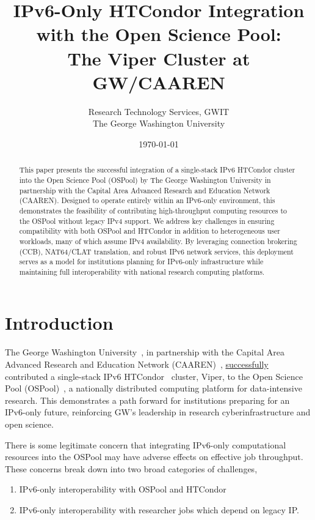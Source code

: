 \documentclass[11pt]{article}
\title{IPv6-Only HTCondor Integration with the Open Science Pool: \\
The Viper Cluster at GW/CAAREN}
\author{Research Technology Services, GWIT\\
The George Washington University}
\date{\today}
\begin{document}
\maketitle

\begin{abstract}
This paper presents the successful integration of a single-stack IPv6 HTCondor cluster into the Open Science Pool (OSPool) by The George Washington University in partnership with the Capital Area Advanced Research and Education Network (CAAREN). 
Designed to operate entirely within an IPv6-only environment, this demonstrates the feasibility of contributing 
high-throughput computing resources to the OSPool without legacy IPv4 support. We address key challenges in ensuring compatibility
with both OSPool and HTCondor in addition to heterogeneous user workloads, many of which assume IPv4 availability. By leveraging
connection brokering (CCB), NAT64/CLAT translation, and robust IPv6 network services, this deployment serves as a model for institutions
planning for IPv6-only infrastructure while maintaining full interoperability with national research computing platforms.
\end{abstract}
\tableofcontents

\section{Introduction}

The George Washington University~\cite{gwu}, in partnership with the Capital Area Advanced Research and Education Network (CAAREN)~\cite{caaren},  
\href{https://ce-dashboard.ospool.osg-htc.org/overview.html?host=gwu-viper-ce1&r=week}{successfully} 
contributed a single-stack IPv6 HTCondor~\cite{htcondor} cluster, Viper, to the Open Science Pool (OSPool)~\cite{ospool}, a nationally distributed computing platform for data-intensive research. This demonstrates a path forward for institutions preparing for an IPv6-only future, reinforcing GW’s leadership in research cyberinfrastructure and open science.

There is some legitimate concern that integrating IPv6-only computational resources into the OSPool may have adverse effects on effective job throughput. These concerns break down into two broad categories of challenges, 
\begin{enumerate}[itemsep=1pt]
\item IPv6-only interoperability with OSPool and HTCondor 
\item IPv6-only interoperability with researcher jobs which depend on legacy IP. 
\end{enumerate}
\end{document}
